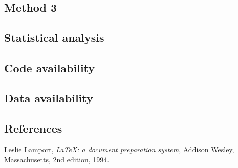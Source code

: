 \documentclass[twocolumn, linenumbers, superscriptaddress]{revtex4-1}
\begin{document}
		\subsection*{Method 3}
			
		\subsection*{Statistical analysis}
			
		\subsection*{Code availability}
			
		\subsection*{Data availability}

	\begin{thebibliography}{50}
		\section*{References}	
			Leslie Lamport,
			\textit{\LaTeX: a document preparation system},
			Addison Wesley, Massachusetts,
			2nd edition,
			1994.

	\end{thebibliography}
\end{document}
